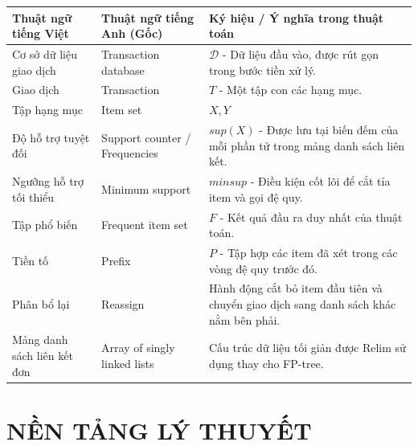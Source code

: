 \documentclass[12pt,a4paper]{report}
\begin{document}
\begin{table}[H]
    \centering
    \begin{tabularx}{\textwidth}{llX}
    \toprule
    \textbf{Thuật ngữ tiếng Việt} & \textbf{Thuật ngữ tiếng Anh (Gốc)} & \textbf{Ký hiệu / Ý nghĩa trong thuật toán} \\
    \midrule
    Cơ sở dữ liệu giao dịch & Transaction database & $\mathcal{D}$ - Dữ liệu đầu vào, được rút gọn trong bước tiền xử lý.\\
    \addlinespace
    Giao dịch & Transaction & $T$ - Một tập con các hạng mục. \\
    \addlinespace
    Tập hạng mục & Item set & $X, Y$ \\
    \addlinespace
    Độ hỗ trợ tuyệt đối & Support counter / Frequencies & $sup(X)$ - Được lưu tại biến đếm của mỗi phần tử trong mảng danh sách liên kết. \\
    \addlinespace
    Ngưỡng hỗ trợ tối thiểu & Minimum support & $minsup$ - Điều kiện cốt lõi để cắt tỉa item và gọi đệ quy. \\
    \addlinespace
    Tập phổ biến & Frequent item set & $F$ - Kết quả đầu ra duy nhất của thuật toán. \\
    \addlinespace
    Tiền tố & Prefix & $P$ - Tập hợp các item đã xét trong các vòng đệ quy trước đó. \\
    \addlinespace
    Phân bổ lại & Reassign & Hành động cắt bỏ item đầu tiên và chuyển giao dịch sang danh sách khác nằm bên phải. \\
    \addlinespace
    Mảng danh sách liên kết đơn & Array of singly linked lists & Cấu trúc dữ liệu tối giản được Relim sử dụng thay cho FP-tree. \\
    \bottomrule
    \end{tabularx}
\end{table}
\clearpage
% 

% 
% 
% 

\chapter{NỀN TẢNG LÝ THUYẾT}
 
 
\end{document}
